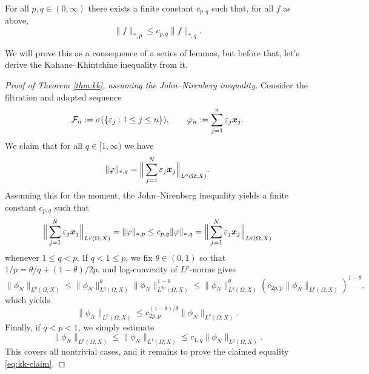 \begin{thm}\label{thm:jn-adapted-sequences}
  For all $p,q \in (0,\infty)$ there exists a finite constant $c_{p,q}$ such that, for all $f$ as above,
  \begin{equation*}
    \|f\|_{*,p} \leq c_{p,q} \|f\|_{*,q}.
  \end{equation*}
\end{thm}

We will prove this as a consequence of a series of lemmas, but before that, let's derive the Kahane--Khintchine inequality from it.

\begin{proof}[Proof of Theorem \ref{thm:kk}, assuming the John--Nirenberg inequality]
  Consider the filtration and adapted sequence
  \begin{equation*}
    \mathcal{F}_n := \sigma(\{\varepsilon_j : 1 \leq j \leq n\}), \qquad \varphi_n := \sum_{j=1}^n \varepsilon_j \bm{x}_j.
  \end{equation*}
  We claim that for all $q \in [1,\infty)$ we have
  \begin{equation}\label{eq:kk-claim}
    \|\varphi\|_{*,q} = \Big\| \sum_{j=1}^N \varepsilon_j \bm{x}_j \Big\|_{L^q(\Omega;X)}.
  \end{equation}
  Assuming this for the moment, the John--Nirenberg inequality yields a finite constant $c_{p,q}$ such that
  \begin{equation*}
    \Big\| \sum_{j=1}^N \varepsilon_j \bm{x}_j \Big\|_{L^p(\Omega;X)}
    = \|\varphi\|_{*,p}
    \leq c_{p,q} \|\varphi\|_{*,q}
    = \Big\| \sum_{j=1}^N \varepsilon_j \bm{x}_j \Big\|_{L^q(\Omega;X)}
  \end{equation*}
  whenever $1 \leq q < p$.
  If $q < 1 \leq p$, we fix $\theta \in (0,1)$ so that $1/p = \theta/q + (1-\theta)/2p$, and log-convexity of $L^p$-norms gives
  \begin{equation*}
    \| \phi_N \|_{L^p(\Omega;X)}
    \leq \| \phi_N \|_{L^q(\Omega;X)}^{\theta} \| \phi_N \|_{L^{2p}(\Omega;X)}^{1 - \theta}
    \leq \| \phi_N \|_{L^q(\Omega;X)}^{\theta} (c_{2p,p} \| \phi_N \|_{L^{p}(\Omega;X)})^{1 - \theta},
  \end{equation*}
  which yields
  \begin{equation*}
    \| \phi_N \|_{L^p(\Omega;X)} \leq c_{2p,p}^{(1 - \theta)/\theta} \| \phi_N \|_{L^q(\Omega;X)}.
  \end{equation*}
  Finally, if $q < p < 1$, we simply estimate
  \begin{equation*}
    \| \phi_N \|_{L^p(\Omega;X)} \leq \| \phi_N \|_{L^1(\Omega;X)} \leq c_{1,q} \| \phi_N \|_{L^q(\Omega;X)}.
  \end{equation*}
  This covers all nontrivial cases, and it remains to prove the claimed equality \eqref{eq:kk-claim}.


\end{proof}
